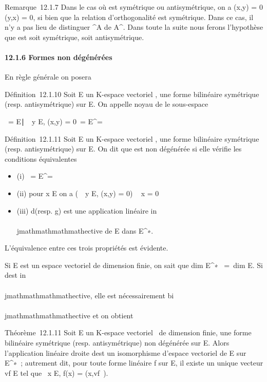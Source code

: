 Remarque~12.1.7 Dans le cas où \phi est symétrique ou antisymétrique, on a
\phi(x,y) = 0 \Leftrightarrow \phi(y,x) = 0, si bien que la
relation d'orthogonalité est symétrique. Dans ce cas, il n'y a pas lieu
de distinguer ^\bot A de A^\bot. Dans toute la suite
nous ferons l'hypothèse que \phi est soit symétrique, soit antisymétrique.

\paragraph{12.1.6 Formes non dégénérées}

En règle générale on posera

Définition~12.1.10 Soit E un K-espace vectoriel , \phi une forme bilinéaire
symétrique (resp. antisymétrique) sur E. On appelle noyau de \phi le
sous-espace

\mathrmKer~\phi =
\x \in
E∣\forall~~y \in E, \phi(x,y) =
0\ = E^\bot =\
\mathrmKerd \phi

Définition~12.1.11 Soit E un K-espace vectoriel , \phi une forme bilinéaire
symétrique (resp. antisymétrique) sur E. On dit que \phi est non dégénérée
si elle vérifie les conditions équivalentes

\begin{itemize}
\itemsep1pt\parskip0pt
\item
  (i) \mathrmKer~\phi =
  E^\bot = \0\
\item
  (ii) pour x \in E on a \left
  (\forall~~y \in E, \phi(x,y) = 0\right ) \rigtharrow~
  x = 0
\item
  (iii) d\phi (resp. g\phi) est une application linéaire
  in\\\\jmathmathmathmathective de E dans E^∗.
\end{itemize}

L'équivalence entre ces trois propriétés est évidente.

Si E est un espace vectoriel de dimension finie, on sait que
dim E^∗~ =\
dim E. Si d\phi est in\\\\jmathmathmathmathective, elle est nécessairement
bi\\\\jmathmathmathmathective et on obtient

Théorème~12.1.11 Soit E un K-espace vectoriel ~de dimension finie, \phi une
forme bilinéaire symétrique (resp. antisymétrique) non dégénérée sur E.
Alors l'application linéaire droite d\phi est un isomorphisme
d'espace vectoriel de E sur E^∗~; autrement dit, pour toute
forme linéaire f sur E, il existe un unique vecteur vf \in E tel
que \forall~x \in E, f(x) = \phi(x,vf~).

